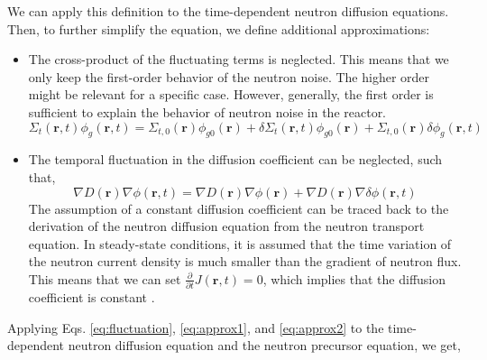 We can apply this definition to the time-dependent neutron diffusion equations. Then, to further simplify the equation, we define additional approximations:
\begin{itemize}
        \item The cross-product of the fluctuating terms is neglected. This means that we only keep the first-order behavior of the neutron noise. The higher order might be relevant for a specific case. However, generally, the first order is sufficient to explain the behavior of neutron noise in the reactor.
        \begin{equation}
                \Sigma_t (\textbf{r}, t) \phi_g (\textbf{r}, t) = \Sigma_{t,0} (\textbf{r}) \phi_{g0} (\textbf{r}) + \delta \Sigma_t (\textbf{r}, t) \phi_{g0} (\textbf{r}) + \Sigma_{t,0} (\textbf{r}) \delta \phi_g (\textbf{r}, t)
                \label{eq:approx1}
        \end{equation}

        \item The temporal fluctuation in the diffusion coefficient can be neglected, such that, 
        \begin{equation}
            \nabla D(\textbf{r}) \nabla \phi(\textbf{r}, t) = \nabla D(\textbf{r}) \nabla \phi(\textbf{r}) + \nabla D(\textbf{r}) \nabla \delta \phi(\textbf{r}, t)
            \label{eq:approx2}
        \end{equation}
        The assumption of a constant diffusion coefficient can be traced back to the derivation of the neutron diffusion equation from the neutron transport equation. In steady-state conditions, it is assumed that the time variation of the neutron current density is much smaller than the gradient of neutron flux. This means that we can set $\frac{\partial}{\partial t} J(\textbf{r},t)=0$, which implies that the diffusion coefficient is constant \cite{bellNuclearReactorTheory1970, larssonComparativeStudy2group2009}.
\end{itemize}

Applying Eqs. \ref{eq:fluctuation}, \ref{eq:approx1}, and \ref{eq:approx2} to the time-dependent neutron diffusion equation and the neutron precursor equation, we get,

